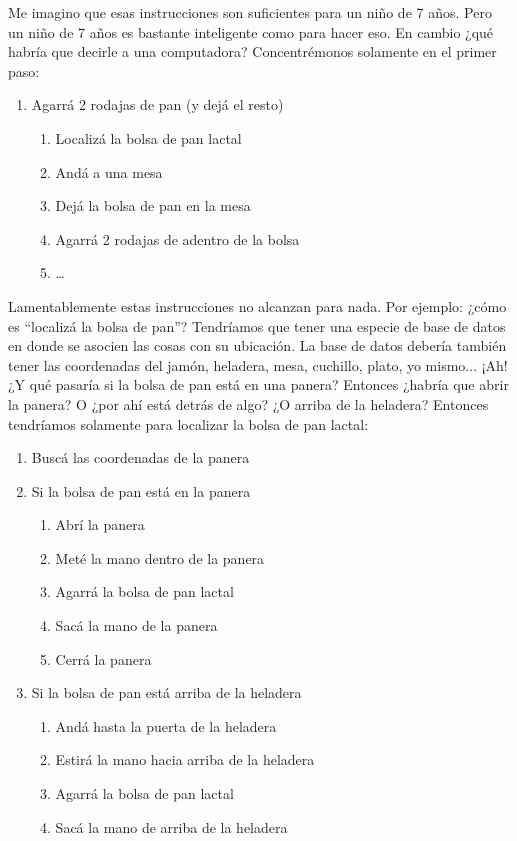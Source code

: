 Me imagino que esas instrucciones son suficientes para un niño de 7 años. Pero un niño de 7 años es bastante inteligente como para hacer eso. En cambio ¿qué habría que decirle a una computadora? Concentrémonos solamente en el primer paso:

\begin{enumerate}
  \item Agarrá 2 rodajas de pan (y dejá el resto)
  \begin{enumerate}
    \item Localizá la bolsa de pan lactal
    \item Andá a una mesa
    \item Dejá la bolsa de pan en la mesa
    \item Agarrá 2 rodajas de adentro de la bolsa
    \item \ldots
  \end{enumerate}
\end{enumerate}

Lamentablemente estas instrucciones no alcanzan para nada. Por ejemplo: ¿cómo es “localizá la bolsa de pan”? Tendríamos que tener una especie de base de datos en donde se asocien las cosas con su ubicación. La base de datos debería también tener las coordenadas del jamón, heladera, mesa, cuchillo, plato, yo mismo...
¡Ah! ¿Y qué pasaría si la bolsa de pan está en una panera? Entonces ¿habría que abrir la panera? O ¿por ahí está detrás de algo? ¿O arriba de la heladera? Entonces tendríamos solamente para localizar la bolsa de pan lactal:
\begin{enumerate}
  \item Buscá las coordenadas de la panera
  \item Si la bolsa de pan está en la panera
  \begin{enumerate}
    \item Abrí la panera
    \item Meté la mano dentro de la panera
    \item Agarrá la bolsa de pan lactal
    \item Sacá la mano de la panera
    \item Cerrá la panera
  \end{enumerate}
  \item Si la bolsa de pan está arriba de la heladera
  \begin{enumerate}
    \item Andá hasta la puerta de la heladera
    \item Estirá la mano hacia arriba de la heladera
    \item Agarrá la bolsa de pan lactal
    \item Sacá la mano de arriba de la heladera
  \end{enumerate}
\end{enumerate}

